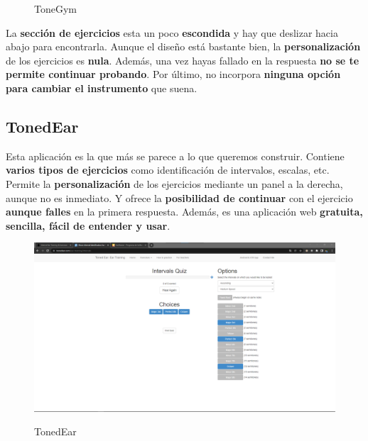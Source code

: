 \documentclass[12pt,twoside,titlepage]{report}
\begin{document}
\begin{figure}[H]
    \centering
    \caption{ToneGym}
    \label{f:ToneGym2}
   \end{figure}

La \textbf{sección de ejercicios} esta un poco \textbf{escondida} y hay que deslizar hacia abajo para encontrarla. Aunque el diseño está bastante bien, la \textbf{personalización} de los ejercicios es \textbf{nula}. Además, una vez hayas fallado en la respuesta \textbf{no se te permite continuar probando}. Por último, no incorpora \textbf{ninguna opción para cambiar el instrumento} que suena.

\subsection{TonedEar}

Esta aplicación es la que más se parece a lo que queremos construir. Contiene \textbf{varios tipos de ejercicios} como identificación de intervalos, escalas, etc. Permite la \textbf{personalización} de los ejercicios mediante un panel a la derecha, aunque no es inmediato. Y ofrece la \textbf{posibilidad de continuar} con el ejercicio \textbf{aunque falles} en la primera respuesta. Además, es una aplicación web \textbf{gratuita, sencilla, fácil de entender y usar}.

\begin{figure}[H] 
    \includegraphics[scale=0.25]{Estado del Arte/tonedear}
    \centering
    \label{fig:tonedear}
    \caption{TonedEar}
\end{figure}
\end{document}
